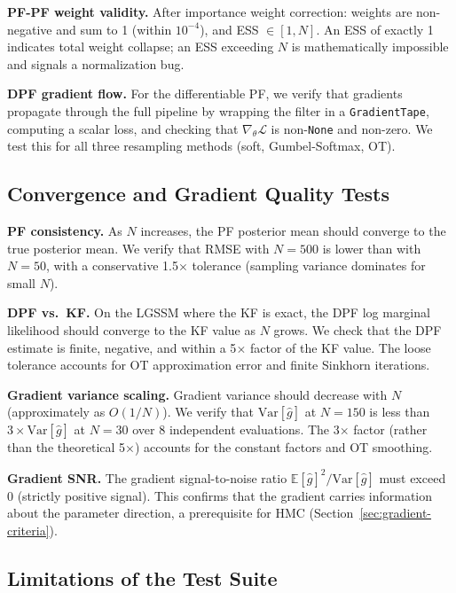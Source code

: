 \documentclass[12pt,a4paper]{article}
\theoremstyle{definition}
\theoremstyle{remark}
\newcommand{\E}{\mathbb{E}}
\begin{document}
\textbf{PF-PF weight validity.} After importance weight correction: weights are non-negative and sum to 1 (within $10^{-4}$), and ESS $\in [1, N]$. An ESS of exactly 1 indicates total weight collapse; an ESS exceeding $N$ is mathematically impossible and signals a normalization bug.

\textbf{DPF gradient flow.} For the differentiable PF, we verify that gradients propagate through the full pipeline by wrapping the filter in a \texttt{GradientTape}, computing a scalar loss, and checking that $\nabla_\theta \mathcal{L}$ is non-\texttt{None} and non-zero. We test this for all three resampling methods (soft, Gumbel-Softmax, OT).

\subsection{Convergence and Gradient Quality Tests}

\textbf{PF consistency.} As $N$ increases, the PF posterior mean should converge to the true posterior mean. We verify that RMSE with $N=500$ is lower than with $N=50$, with a conservative 1.5$\times$ tolerance (sampling variance dominates for small $N$).

\textbf{DPF vs.\ KF.} On the LGSSM where the KF is exact, the DPF log marginal likelihood should converge to the KF value as $N$ grows. We check that the DPF estimate is finite, negative, and within a 5$\times$ factor of the KF value. The loose tolerance accounts for OT approximation error and finite Sinkhorn iterations.

\textbf{Gradient variance scaling.} Gradient variance should decrease with $N$ (approximately as $O(1/N)$). We verify that $\text{Var}[\hat{g}]$ at $N = 150$ is less than $3 \times \text{Var}[\hat{g}]$ at $N = 30$ over 8 independent evaluations. The 3$\times$ factor (rather than the theoretical 5$\times$) accounts for the constant factors and OT smoothing.

\textbf{Gradient SNR.} The gradient signal-to-noise ratio $\E[\hat{g}]^2 / \text{Var}[\hat{g}]$ must exceed 0 (strictly positive signal). This confirms that the gradient carries information about the parameter direction, a prerequisite for HMC (Section~\ref{sec:gradient-criteria}).

\subsection{Limitations of the Test Suite}
\end{document}

